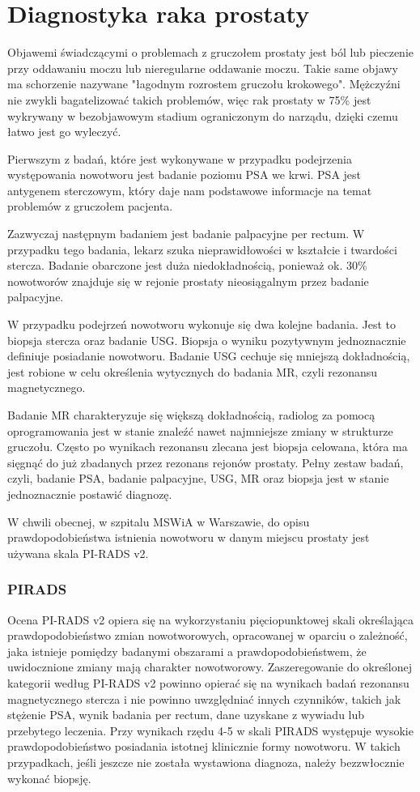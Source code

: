\documentclass[a4paper,11pt,twoside]{report}
\theoremstyle{definition}
\begin{document}
\section{Diagnostyka raka prostaty}
Objawemi świadczącymi o problemach z gruczołem prostaty jest ból lub pieczenie przy oddawaniu moczu lub nieregularne oddawanie moczu. Takie same objawy ma schorzenie nazywane "łagodnym rozrostem gruczołu krokowego". Mężczyźni nie zwykli bagatelizować takich problemów, więc rak prostaty w 75\% jest wykrywany w bezobjawowym stadium ograniczonym do narządu, dzięki czemu łatwo jest go wyleczyć. 
\par
Pierwszym z badań, które jest wykonywane w przypadku podejrzenia występowania nowotworu jest badanie poziomu PSA we krwi. PSA jest antygenem sterczowym, który daje nam podstawowe informacje na temat problemów z gruczołem pacjenta.
\par
Zazwyczaj następnym badaniem jest badanie palpacyjne per rectum. W przypadku tego badania, lekarz szuka nieprawidłowości w kształcie i twardości stercza. Badanie obarczone jest duża niedokładnością, ponieważ ok. 30\% nowotworów znajduje się w rejonie prostaty nieosiągalnym przez badanie palpacyjne. 
\par
W przypadku podejrzeń nowotworu wykonuje się dwa kolejne badania. Jest to biopsja stercza oraz badanie USG. Biopsja o wyniku pozytywnym jednoznacznie definiuje posiadanie nowotworu. Badanie USG cechuje się mniejszą dokładnością,  jest robione w celu określenia wytycznych do badania MR, czyli rezonansu magnetycznego.
\par
Badanie MR charakteryzuje się większą dokładnością, radiolog za pomocą oprogramowania jest w stanie znaleźć nawet najmniejsze zmiany w strukturze gruczołu. Często po wynikach rezonansu zlecana jest biopsja celowana, która ma sięgnąć do już zbadanych przez rezonans rejonów prostaty. 
Pełny zestaw badań, czyli, badanie PSA, badanie palpacyjne, USG, MR oraz biopsja jest w stanie jednoznacznie postawić diagnozę.
\par
W chwili obecnej, w szpitalu MSWiA w Warszawie, do opisu prawdopodobieństwa istnienia nowotworu w danym miejscu prostaty jest używana skala PI-RADS v2.

\subsubsection{PIRADS} 
Ocena PI-RADS v2 opiera się na wykorzystaniu pięciopunktowej skali określająca prawdopodobieństwo zmian nowotworowych, opracowanej w oparciu o zależność, jaka istnieje pomiędzy badanymi obszarami a prawdopodobieństwem, że uwidocznione zmiany mają charakter nowotworowy. Zaszeregowanie do określonej kategorii według PI-RADS v2 powinno opierać się na wynikach badań rezonansu magnetycznego stercza i nie powinno uwzględniać innych czynników, takich jak stężenie PSA, wynik badania per rectum, dane uzyskane z wywiadu lub przebytego leczenia. Przy wynikach rzędu 4-5 w skali PIRADS występuje wysokie prawdopodobieństwo posiadania istotnej klinicznie formy nowotworu. W takich przypadkach, jeśli jeszcze nie została wystawiona diagnoza, należy bezzwłocznie wykonać biopsję.
\end{document}
